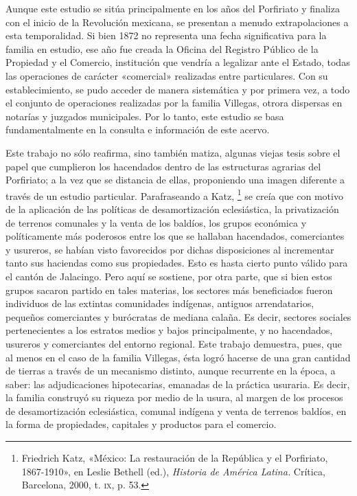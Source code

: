 \documentclass[14pt,twoside,final]{extbook} %
\let\oldfootnote\footnote
\renewcommand\footnote[1]{%
\oldfootnote{\hspace{1mm}#1}}
\begin{document}
Aunque este estudio se sitúa principalmente en los años del Porfiriato y finaliza con el inicio de la Revolución mexicana, se presentan a menudo extrapolaciones a esta temporalidad. Si bien 1872 no representa una fecha significativa para la familia en estudio, ese año fue creada la Oficina del Registro Público de la Propiedad y el Comercio, institución que vendría a legalizar ante el Estado, todas las operaciones de carácter «comercial» realizadas entre particulares. Con su establecimiento, se pudo acceder de manera sistemática y por primera vez, a todo el conjunto de operaciones realizadas por la familia Villegas, otrora dispersas en notarías y juzgados municipales. Por lo tanto, este estudio se basa fundamentalmente en la consulta e información de este acervo.

Este trabajo no sólo reafirma, sino también matiza, algunas viejas tesis sobre el papel que cumplieron los hacendados dentro de las estructuras agrarias del Porfiriato; a la vez que se distancia de ellas, proponiendo una imagen diferente a través de un estudio particular. Parafraseando a Katz,\footnote{Friedrich Katz, «México: La restauración de la República y el Porfiriato, 1867-1910», en Leslie Bethell (ed.), \emph{Historia de América Latina.} Crítica, Barcelona, 2000, t. \textsc{ix}, p. 53.} se creía que con motivo de la aplicación de las políticas de desamortización eclesiástica, la privatización de terrenos comunales y la venta de los baldíos, los grupos económica y políticamente más poderosos entre los que se hallaban hacendados, comerciantes y usureros, se habían visto favorecidos por dichas disposiciones al incrementar tanto sus haciendas como sus propiedades. Esto es hasta cierto punto válido para el cantón de Jalacingo. Pero aquí se sostiene, por otra parte, que si bien estos grupos sacaron partido en tales materias, los sectores más beneficiados fueron individuos de las extintas comunidades indígenas, antiguos arrendatarios, pequeños comerciantes y burócratas de mediana calaña. Es decir, sectores sociales pertenecientes a los estratos medios y bajos principalmente, y no hacendados, usureros y comerciantes del entorno regional. Este trabajo demuestra, pues, que al menos en el caso de la familia Villegas, ésta logró hacerse de una gran cantidad de tierras a través de un mecanismo distinto, aunque recurrente en la época, a saber: las adjudicaciones hipotecarias, emanadas de la práctica usuraria. Es decir, la familia construyó su riqueza por medio de la usura, al margen de los procesos de desamortización eclesiástica, comunal indígena y venta de terrenos baldíos, en la forma de propiedades, capitales y productos para el comercio.
\end{document}
